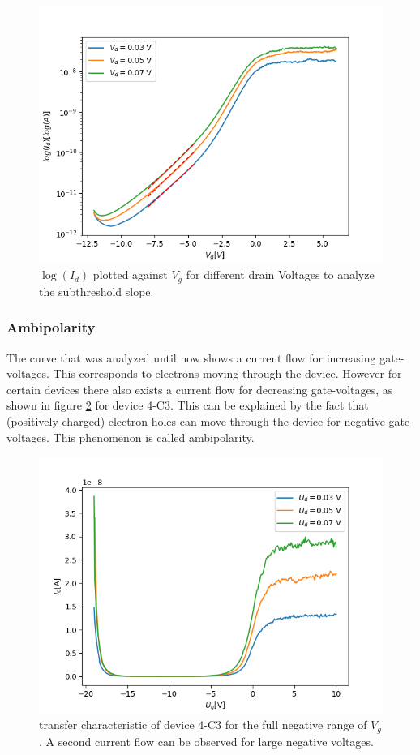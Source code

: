 \documentclass[%
 reprint,
amsmath,amssymb,
pra,
]{revtex4-1}
\begin{document}
\begin{figure}[h]
\centering
\includegraphics[scale=0.55]{Bilder/log.png}
\caption{$\log(I_d)$ plotted against $V_g$ for different drain Voltages to analyze the subthreshold slope.}
\label{fig:log}
\end{figure}



\subsubsection{Ambipolarity}
The curve that was analyzed until now shows a current flow for increasing gate-voltages. This corresponds to electrons moving through the device. However for certain devices there also exists a current flow for decreasing gate-voltages, as shown in figure \ref{fig:ambipol} for device 4-C3. This can be explained by the fact that (positively charged) electron-holes can move through the device for negative gate-voltages. This phenomenon is called ambipolarity.

\begin{figure}[b]
\centering
\includegraphics[scale=0.6]{Bilder/amipol.png}
\caption{transfer characteristic of device 4-C3 for the full negative range of $V_g$. A second current flow can be observed for large negative voltages.}
\label{fig:ambipol}
\end{figure}
\end{document}
